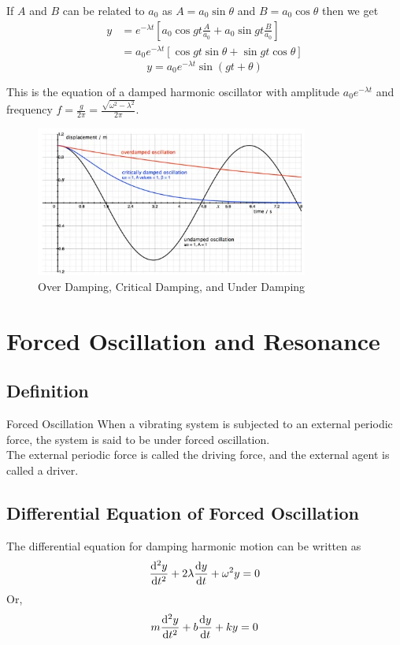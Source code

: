 \documentclass[12pt]{article}
\numberwithin{equation}{subsection}
\begin{document}
If $A$ and $B$ can be related to $a_0$ as $A = a_0\sin{\theta}$ and $B = a_0\cos{\theta}$ then we get
\begin{align*}
    y &= e^{-\lambda t} \left[ a_0\cos{gt}\frac{A}{a_0} + a_0\sin{gt}\frac{B}{a_0} \right] \\
    &= a_0 e^{-\lambda t} \left[ \cos{gt}\sin{\theta} + \sin{gt}\cos{\theta} \right]
\end{align*}
\begin{equation}
    \boxed{ y = a_0 e^{-\lambda t} \sin{(gt+\theta)} }
\end{equation}

This is the equation of a damped harmonic oscillator with amplitude $a_0e^{-\lambda t}$ and frequency $\displaystyle f = \frac{g}{2\pi} = \frac{\sqrt{\omega^2-\lambda^2}}{2\pi}$.

\begin{figure}[htpb]
    \centering
    \includegraphics[width=0.8\textwidth]{Damping.png}
    \caption{Over Damping, Critical Damping, and Under Damping}
    \label{fig:Damping-png}
\end{figure}


\section{Forced Oscillation and Resonance}
\subsection{Definition}
\begin{definition}{Forced Oscillation}{}
    When a vibrating system is subjected to an external periodic force, the system is said to be under forced oscillation. \\
    The external periodic force is called the driving force, and the external agent is called a driver.
\end{definition}

\subsection{Differential Equation of Forced Oscillation}
The differential equation for damping harmonic motion can be written as \[
    \dv[2]{y}{t} + 2\lambda \dv{y}{t} + \omega^2 y = 0
\] Or, \[
    m \dv[2]{y}{t} + b \dv{y}{t} + ky = 0
\]
\end{document}

